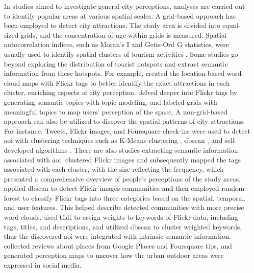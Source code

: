 \documentclass{article}
\theoremstyle{remark}
\begin{document}
In studies aimed to investigate general city perceptions, analyses are carried out to identify popular areas at various spatial scales. A grid-based approach has been employed to detect city attractions. The study area is divided into equal-sized grids, and the concentration of \acrshort{ugc} within grids is measured. Spatial autocorrelation indices, such as Moran's I and Getis-Ord G statistics, were usually used to identify spatial clusters of tourism activities \citep{garcia-palomares_identification_2015, kim_coastal_2021}. Some studies go beyond exploring the distribution of tourist hotspots and extract semantic information from these hotspots. For example, \cite{li_analyzing_2018} created the location-based word-cloud maps with Flickr tags to better identify the exact attractions in each cluster, enriching aspects of city perception. \cite{bahrehdar_description_2018} delved deeper into Flickr tags by generating semantic topics with topic modeling, and labeled grids with meaningful topics to map users' perception of the space. A non-grid-based approach can also be utilized to discover the spatial patterns of city attractions. For instance, Tweets, Flickr images, and Foursquare check-ins were used to detect \acrfull{aoi} with clustering techniques such as K-Means clustering \citep{hartigan_algorithm_1979}, \acrfull{dbscan} \citep{ester_density-based_1996}, and self-developed algorithms \citep{hu_extracting_2015, hasnat_identifying_2018, cranshaw_livehoods_2021}. There are also studies extracting semantic information associated with \acrshort{aoi}. \cite{dunkel_visualizing_2015} clustered Flickr images and subsequently mapped the tags associated with each cluster, with the size reflecting the frequency, which presented a comprehensive overview of people's perceptions of the study areas. \cite{zhou_detecting_2015} applied \acrshort{dbscan} to detect Flickr images communities and then employed random forest to classify Flickr tags into three categories based on the spatial, temporal, and user features. This helped describe detected communities with more precise word clouds. \cite{jailani_machine_2021} used \acrfull{tfidf} to assign weights to keywords of Flickr data, including tags, titles, and descriptions, and utilized \acrshort{dbscan} to cluster weighted keywords, thus the discovered \acrshort{aoi} were integrated with intrinsic semantic information. \cite{santos_uncovering_2018} collected reviews about places from Google Places and Foursquare tips, and generated perception maps to uncover how the urban outdoor areas were expressed in social media.
\end{document}
